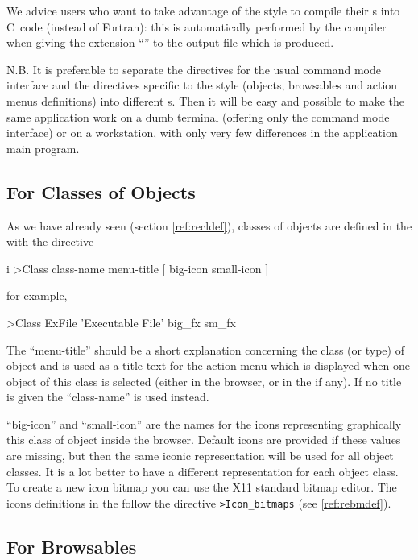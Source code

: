 We advice users who want to take advantage of the \Motif{} style to compile 
their \CDF{}s into C~code (instead of Fortran): this is automatically 
performed by the \KUIPC{} compiler when giving the extension ``'' to the 
output file which is produced.

N.B. It is preferable to separate the directives for the usual command mode
interface and the directives specific to the \Motif{} style (objects, browsables
and action menus definitions) into different \CDF{}s. Then it will be easy
and possible to make the same application work on a dumb terminal (offering 
only the \KUIP{} command mode interface) or on a \Motif{} workstation, with only 
very few differences in the application main program. 

\subsection{For Classes of Objects}
\label{ref:recdfobj}

As we have already seen (section \ref{ref:recldef}), classes of objects 
are defined in the \CDF{} with the directive
\begin{Gray}{i}
>Class  class-name  menu-title  [ big-icon  small-icon ]
\end{Gray}
for example,
\begin{XMP}
>Class ExFile 'Executable File' big_fx sm_fx
\end{XMP}

The ``menu-title'' should be a short explanation concerning the class (or type)
of object and is used as a title text for the action menu which is displayed
when one object of this class is selected (either in the browser, or in the
\GW{} if any). If no title is given the ``class-name'' is used 
instead. 

``big-icon'' and ``small-icon'' are the names for the icons representing 
graphically this class of object inside the browser. Default icons are
provided if these values are missing, but then the same iconic representation
will be used for all object classes. It is a lot better to have a different
representation for each object class. To create a new icon bitmap you can use
the X11 standard bitmap editor. The icons definitions in the \CDF{} follow
the directive {\tt >Icon\_bitmaps} (see \ref{ref:rebmdef}).


\subsection{For Browsables}
\label{ref:recdfbro}

